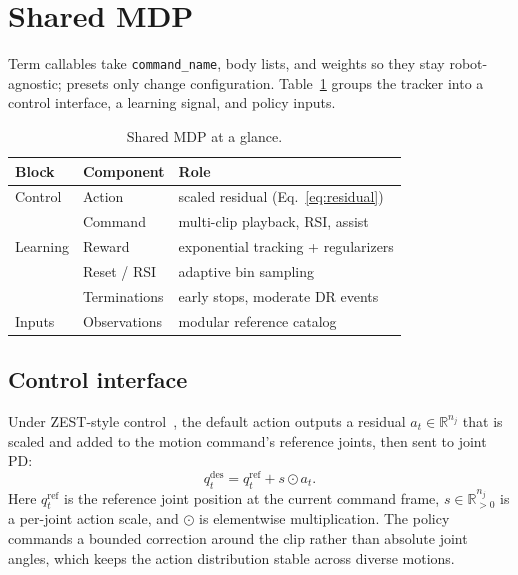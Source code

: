 \documentclass[11pt,a4paper]{article}
\begin{document}
\section{Shared MDP}
\label{sec:mdp}

Term callables take \texttt{command\_name}, body lists, and weights so they
stay robot-agnostic; presets only change configuration. Table~\ref{tab:mdp-glance}
groups the tracker into a control interface, a learning signal, and policy
inputs.

\begin{table}[t]
  \centering
  \small
  \caption{Shared MDP at a glance.}
  \label{tab:mdp-glance}
  \begin{tabular}{@{}lll@{}}
    \toprule
    Block & Component & Role \\
    \midrule
    Control & Action & scaled residual
      (Eq.~\eqref{eq:residual}) \\
     & Command & multi-clip playback, RSI, assist \\
    Learning & Reward & exponential tracking + regularizers \\
     & Reset / RSI & adaptive bin sampling \\
     & Terminations & early stops, moderate DR events \\
    Inputs & Observations & modular reference catalog \\
    \bottomrule
  \end{tabular}
\end{table}

\subsection{Control interface}
\label{sec:actions}
Under ZEST-style control~\citep{zest2026}, the default action outputs a residual
$a_t\in\mathbb{R}^{n_j}$ that is scaled and added to the motion command's
reference joints, then sent to joint PD:
\begin{equation}
  q^{\mathrm{des}}_t
    = q^{\mathrm{ref}}_t
      + s \odot a_t .
  \label{eq:residual}
\end{equation}
Here $q^{\mathrm{ref}}_t$ is the reference joint position at the current
command frame, $s\in\mathbb{R}^{n_j}_{>0}$ is a per-joint action scale, and
$\odot$ is elementwise multiplication. The policy commands a bounded correction
around the clip rather than absolute joint angles, which keeps the action
distribution stable across diverse motions.
\end{document}

